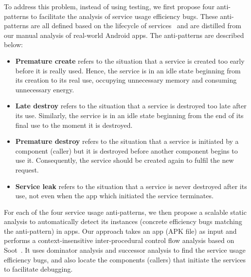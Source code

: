 \documentclass[conference]{IEEEtran}
\begin{document}

To address this problem, instead of using testing, we first propose four
anti-patterns to facilitate the analysis of service usage
efficiency bugs. These anti-patterns are all defined based on the lifecycle
of services~\cite{Androidservice} and are distilled from our manual analysis
of real-world Android apps. The anti-patterns are described below:
\begin{itemize}
  \item {\bf Premature create} refers to the situation that a
service is created too early before it is really used. Hence, the service is in
an idle state beginning from its creation to its real use, occupying unnecessary
memory and consuming unnecessary energy.
\item  {\bf Late destroy} refers to the situation
that a service is destroyed too late after its use. Similarly, the service is in
an idle state beginning from the end of its final use to the moment it is destroyed.
\item {\bf Premature destroy} refers to the situation that a service is initiated by a
component (caller) but it is destroyed before another component begins to use
it. Consequently, the service should be created again to fulfil the new request.
\item {\bf Service leak} refers to the situation that a service is never destroyed
after its use, not even when the app which initiated the service terminates.
\end{itemize}

For each of the four service usage anti-patterns, we then propose a scalable
static analysis to automatically detect its instances (concrete efficiency
bugs matching the anti-pattern) in apps.
Our approach takes an app (APK file) as input and performs a context-insensitive
inter-procedural control flow analysis based on Soot~\cite{sootpaper}. It uses
dominator analysis and successor analysis to find the service usage efficiency
bugs, and also locate the components (callers) that
initiate the services to facilitate debugging.
\end{document}
